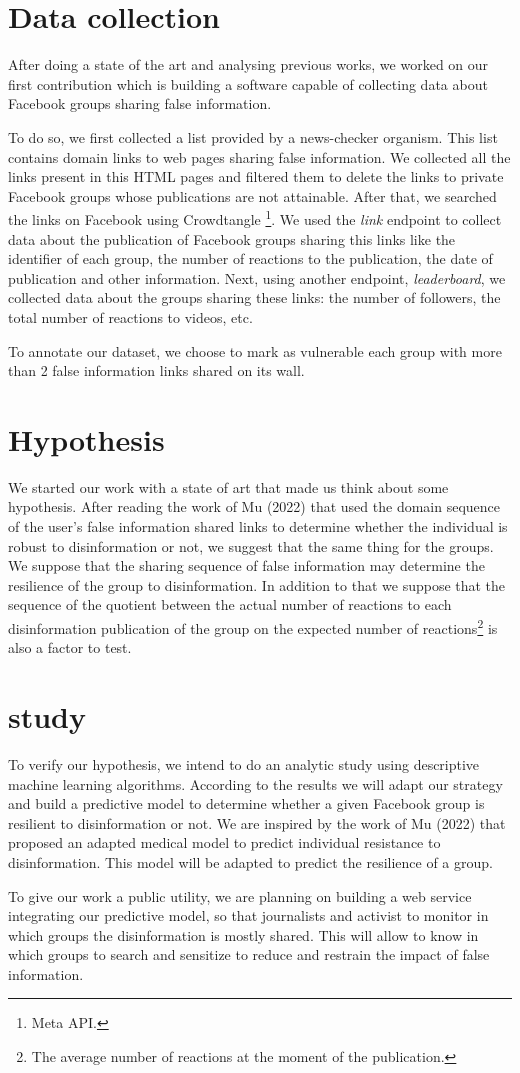 \documentclass[12pt,sigconf,letterpaper,anonymous,nonacm]{acmart}
\begin{document}
\section{Data collection}
After doing a state of the art and analysing previous works, we worked on our first contribution which is building a software capable of collecting data about Facebook groups sharing false information.\par
To do so, we first collected a list provided by a news-checker organism. This list contains domain links to web pages sharing false information. We collected all the links present in this HTML pages and filtered them to delete the links to private Facebook groups whose publications are not attainable. After that, we searched the links on Facebook using Crowdtangle \footnote{Meta API.}. We used the \emph{link} endpoint to collect data about the publication of Facebook groups sharing this links like the identifier of each group, the number of reactions to the publication, the date of publication and other information. Next, using another endpoint, \emph{leaderboard}, we collected data about the groups sharing these links: the number of followers, the total number of reactions to videos, etc.\par
To annotate our dataset, we choose to mark as vulnerable each group with more than 2 false information links shared on its wall.

\section{Hypothesis}
We started our work with a state of art that made us think about some hypothesis. After reading the work of Mu (2022) \cite{29_rapp} that used the domain sequence of the user's false information shared links to determine whether the individual is robust to disinformation or not, we suggest that the same thing for the groups. We suppose that the sharing sequence of false information may determine the resilience of the group to disinformation. In addition to that we suppose that the sequence of the quotient between the actual number of reactions to each disinformation publication of the group on the expected number of reactions\footnote{The average number of reactions at the moment of the publication.} is also a factor to test.
\section{study}
To verify our hypothesis, we intend to do an analytic study using descriptive machine learning algorithms. According to the results we will adapt our strategy and build a predictive model to determine whether a given Facebook group is resilient to disinformation or not. We are inspired by the work of Mu (2022) \cite{29_rapp} that proposed an adapted medical model to predict individual resistance to disinformation. This model will be adapted to predict the resilience of a group.\par
To give our work a public utility, we are planning on building a web service integrating our predictive model, so that journalists and activist to monitor in which groups the disinformation is mostly shared. This will allow to know in which groups to search and sensitize to reduce and restrain the impact of false information.
\end{document}
